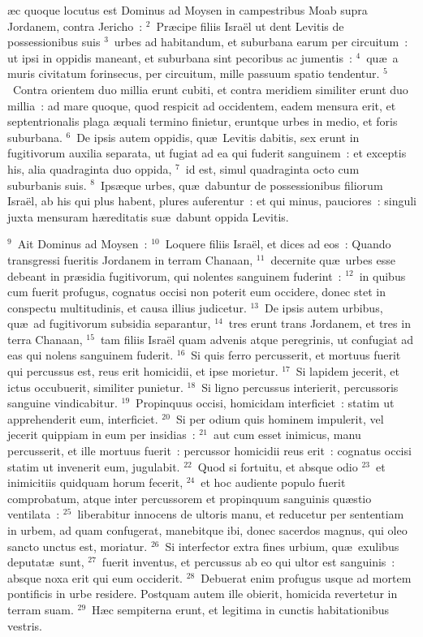\bchapter
{}\ae c quoque locutus est Dominus ad Moysen in campestribus Moab supra Jordanem, contra Jericho~:
${}^{2}$~Pr\ae cipe filiis Isra\"el ut dent Levitis de possessionibus suis
${}^{3}$~urbes ad habitandum, et suburbana earum per circuitum~: ut ipsi in oppidis maneant, et suburbana sint pecoribus ac jumentis~:
${}^{4}$~qu\ae\ a muris civitatum forinsecus, per circuitum, mille passuum spatio tendentur.
${}^{5}$~Contra orientem duo millia erunt cubiti, et contra meridiem similiter erunt duo millia~: ad mare quoque, quod respicit ad occidentem, eadem mensura erit, et septentrionalis plaga \ae quali termino finietur, eruntque urbes in medio, et foris suburbana.
${}^{6}$~De ipsis autem oppidis, qu\ae\ Levitis dabitis, sex erunt in fugitivorum auxilia separata, ut fugiat ad ea qui fuderit sanguinem~: et exceptis his, alia quadraginta duo oppida,
${}^{7}$~id est, simul quadraginta octo cum suburbanis suis.
${}^{8}$~Ips\ae que urbes, qu\ae\ dabuntur de possessionibus filiorum Isra\"el, ab his qui plus habent, plures auferentur~: et qui minus, pauciores~: singuli juxta mensuram h\ae reditatis su\ae\ dabunt oppida Levitis.


${}^{9}$~Ait Dominus ad Moysen~:
${}^{10}$~Loquere filiis Isra\"el, et dices ad eos~: Quando transgressi fueritis Jordanem in terram Chanaan,
${}^{11}$~decernite qu\ae\ urbes esse debeant in pr\ae sidia fugitivorum, qui nolentes sanguinem fuderint~:
${}^{12}$~in quibus cum fuerit profugus, cognatus occisi non poterit eum occidere, donec stet in conspectu multitudinis, et causa illius judicetur.
${}^{13}$~De ipsis autem urbibus, qu\ae\ ad fugitivorum subsidia separantur,
${}^{14}$~tres erunt trans Jordanem, et tres in terra Chanaan,
${}^{15}$~tam filiis Isra\"el quam advenis atque peregrinis, ut confugiat ad eas qui nolens sanguinem fuderit.
${}^{16}$~Si quis ferro percusserit, et mortuus fuerit qui percussus est, reus erit homicidii, et ipse morietur.
${}^{17}$~Si lapidem jecerit, et ictus occubuerit, similiter punietur.
${}^{18}$~Si ligno percussus interierit, percussoris sanguine vindicabitur.
${}^{19}$~Propinquus occisi, homicidam interficiet~: statim ut apprehenderit eum, interficiet.
${}^{20}$~Si per odium quis hominem impulerit, vel jecerit quippiam in eum per insidias~:
${}^{21}$~aut cum esset inimicus, manu percusserit, et ille mortuus fuerit~: percussor homicidii reus erit~: cognatus occisi statim ut invenerit eum, jugulabit.
${}^{22}$~Quod si fortuitu, et absque odio
${}^{23}$~et inimicitiis quidquam horum fecerit,
${}^{24}$~et hoc audiente populo fuerit comprobatum, atque inter percussorem et propinquum sanguinis qu\ae stio ventilata~:
${}^{25}$~liberabitur innocens de ultoris manu, et reducetur per sententiam in urbem, ad quam confugerat, manebitque ibi, donec sacerdos magnus, qui oleo sancto unctus est, moriatur.
${}^{26}$~Si interfector extra fines urbium, qu\ae\ exulibus deputat\ae\ sunt,
${}^{27}$~fuerit inventus, et percussus ab eo qui ultor est sanguinis~: absque noxa erit qui eum occiderit.
${}^{28}$~Debuerat enim profugus usque ad mortem pontificis in urbe residere. Postquam autem ille obierit, homicida revertetur in terram suam.
${}^{29}$~H\ae c sempiterna erunt, et legitima in cunctis habitationibus vestris.


